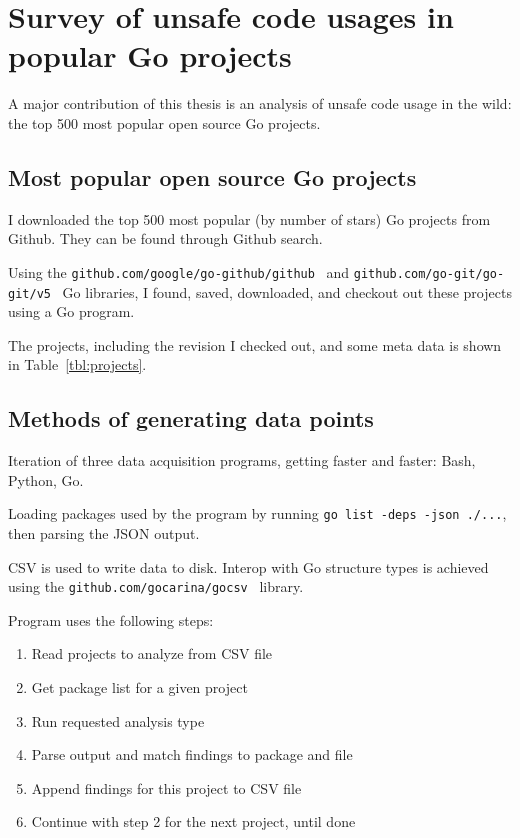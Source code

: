 
\chapter{Survey of unsafe code usages in popular Go projects}\label{ch:survey}

A major contribution of this thesis is an analysis of unsafe code usage in the wild:
the top 500 most popular open source Go projects.



\section{Most popular open source Go projects}\label{sec:most-popular-projects}

I downloaded the top 500 most popular (by number of stars) Go projects from Github.
They can be found through Github search.

Using the \texttt{github.com/google/go-github/github}~\cite{NEEDED} and \texttt{github.com/go-git/go-git/v5}~\cite{NEEDED}
Go libraries, I found, saved, downloaded, and checkout out these projects using a Go program.

The projects, including the revision I checked out, and some meta data is shown in Table~\ref{tbl:projects}.



\section{Methods of generating data points}\label{sec:survey-acquisition-methods}

Iteration of three data acquisition programs, getting faster and faster: Bash, Python, Go.

Loading packages used by the program by running \texttt{go list -deps -json ./...}, then parsing the JSON output.

CSV is used to write data to disk.
Interop with Go structure types is achieved using the \texttt{github.com/gocarina/gocsv}~\cite{NEEDED} library.

Program uses the following steps:

\begin{enumerate}
    \item Read projects to analyze from CSV file
    \item Get package list for a given project
    \item Run requested analysis type
    \item Parse output and match findings to package and file
    \item Append findings for this project to CSV file
    \item Continue with step 2 for the next project, until done
\end{enumerate}

